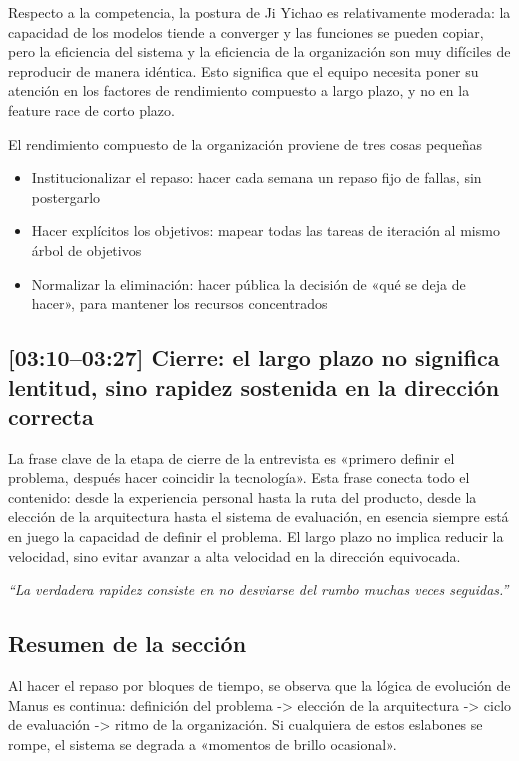 \documentclass[a4paper]{article}
\begin{document}
Respecto a la competencia, la postura de Ji Yichao es relativamente moderada: la capacidad de los modelos tiende a converger y las funciones se pueden copiar, pero la eficiencia del sistema y la eficiencia de la organización son muy difíciles de reproducir de manera idéntica. Esto significa que el equipo necesita poner su atención en los factores de rendimiento compuesto a largo plazo, y no en la feature race de corto plazo.

\begin{knowledgebox}{El rendimiento compuesto de la organización proviene de tres cosas pequeñas}
\begin{itemize}
    \item Institucionalizar el repaso: hacer cada semana un repaso fijo de fallas, sin postergarlo
    \item Hacer explícitos los objetivos: mapear todas las tareas de iteración al mismo árbol de objetivos
    \item Normalizar la eliminación: hacer pública la decisión de «qué se deja de hacer», para mantener los recursos concentrados
\end{itemize}
\end{knowledgebox}

\subsection{[03:10--03:27] Cierre: el largo plazo no significa lentitud, sino rapidez sostenida en la dirección correcta}

La frase clave de la etapa de cierre de la entrevista es «primero definir el problema, después hacer coincidir la tecnología». Esta frase conecta todo el contenido: desde la experiencia personal hasta la ruta del producto, desde la elección de la arquitectura hasta el sistema de evaluación, en esencia siempre está en juego la capacidad de definir el problema. El largo plazo no implica reducir la velocidad, sino evitar avanzar a alta velocidad en la dirección equivocada.

\textit{``La verdadera rapidez consiste en no desviarse del rumbo muchas veces seguidas.''}

\subsection{Resumen de la sección}

Al hacer el repaso por bloques de tiempo, se observa que la lógica de evolución de Manus es continua: definición del problema -> elección de la arquitectura -> ciclo de evaluación -> ritmo de la organización. Si cualquiera de estos eslabones se rompe, el sistema se degrada a «momentos de brillo ocasional».
\end{document}
